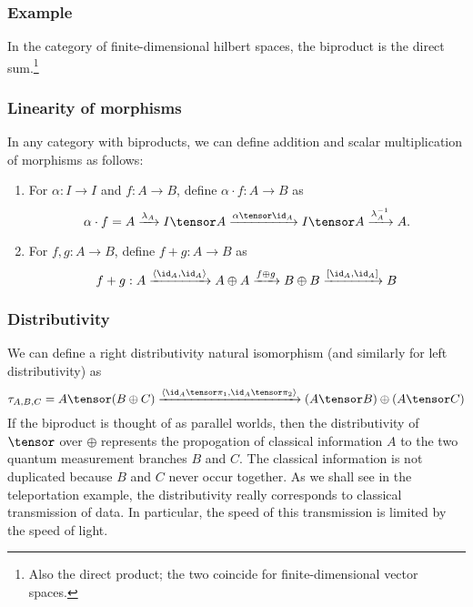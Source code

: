 \subsubsection*{Example} In the category of finite-dimensional hilbert spaces, the 
biproduct is the direct sum.\footnote{Also the direct product; the two coincide
for finite-dimensional vector spaces.}

\subsubsection*{Linearity of morphisms}

 In any category with biproducts, we can define addition and scalar multiplication
of morphisms as follows:
\begin{enumerate}
    \item For $\alpha : I \rightarrow I$ and $f : A \rightarrow B$, define
    $\alpha \cdot f : A \rightarrow B$ as
    \[ \alpha \cdot f = A
    \xrightarrow{\lambda_A} I \tensor A
    \xrightarrow{\alpha \tensor \id_A} I \tensor A
    \xrightarrow{\lambda_A^{-1}} A.
    \]
    \item For $f, g : A \rightarrow B$, define $f + g : A \rightarrow B$ as
    \[ f + g : A
    \xrightarrow{\langle \id_A, \id_A \rangle}
    A \oplus A
    \xrightarrow{f \oplus g}
    B \oplus B  
    \xrightarrow{[\id_A,\id_A]}
    B
    \]
\end{enumerate}

\subsubsection*{Distributivity}
We can define a right distributivity natural isomorphism (and similarly for left distributivity)
as
\[
    \tau_{A,B,C} = A \tensor (B \oplus C)
    \xrightarrow{\langle \id_A \tensor \pi_1, \id_A \tensor \pi_2\rangle}
    (A \tensor B) \oplus (A \tensor C)
\]
If the biproduct is thought of as parallel worlds, then the distributivity of $\tensor$
over $\oplus$ represents the propogation of classical information $A$ to the two
quantum measurement branches $B$ and $C$. The classical information is not duplicated
because $B$ and $C$ never occur together. As we shall see in the teleportation
example, the distributivity really corresponds to classical transmission of data.
In particular, the speed of this transmission is limited by the speed of light.
